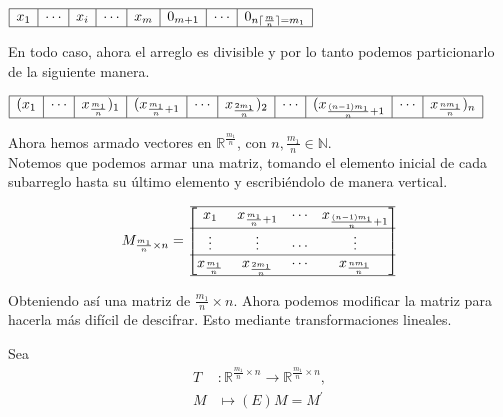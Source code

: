 \documentclass[10pt,a4paper]{article}
\begin{document}
\vspace{10pt}
 
$\begin{array}{|c|c|c|c|c|c|c|c|}
\hline
x_{1} & \cdots & x_{i} & \cdots & x_{m} & 0_{m+1} & \cdots & 0_{n \lceil\frac{m}{n}\rceil=m_{1}}\\
\hline
\end{array}$ 

\vspace{10pt}

En todo caso, ahora el arreglo es divisible y por lo tanto podemos particionarlo de la siguiente manera.

\vspace{10pt}

$\begin{array}{|c|c|c|c|c|c|c|c|c|c|}
\hline
(x_{1} & \cdots & x_{\frac{m_{1}}{n}})_{1} &(x_{\frac{m_{1}}{n}+1} & \cdots & x_{\frac{2m_{1}}{n}})_{2}& \cdots&(x_{\frac{(n-1)m_{1}}{n}+1} & \cdots & x_{\frac{nm_{1}}{n}})_{n}\\
\hline
\end{array}$

\vspace{10pt} 

Ahora hemos armado vectores en $\mathbb{R}^{\frac{m_{1}}{n}}$, con $n,\frac{m_{1}}{n} \in \mathbb{N}$.\\
Notemos que podemos armar una matriz, tomando el elemento inicial de cada subarreglo hasta su último elemento y escribiéndolo de manera vertical.

\vspace{10pt} 
$$
M_{\frac{m_{1}}{n} \times n}=\begin{bmatrix}
\hline
x_{1} & x_{\frac{m_{1}}{n}+1} & \cdots & x_{\frac{(n-1)m_{1}}{n}+1} \\
\hline
\vdots & \vdots & \cdots & \vdots \\
\hline
x_{\frac{m_{1}}{n}} & x_{\frac{2m_{1}}{n}} & \cdots & x_{\frac{nm_{1}}{n}} \\
\hline
\end{bmatrix}
$$
 
\vspace{10pt} 
 
Obteniendo así una matriz de $\frac{m_{1}}{n} \times n$.
Ahora podemos modificar la matriz para hacerla más difícil de descifrar. Esto mediante transformaciones lineales.

\vspace{10pt}

Sea
\begin{align}
T &: \mathbb{R}^{\frac{m_{1}}{n} \times n} \to \mathbb{R}^{\frac{m_{1}}{n} \times n}, \\
  M &\mapsto (E)M=M^{\prime}
\end{align}
\end{document}
